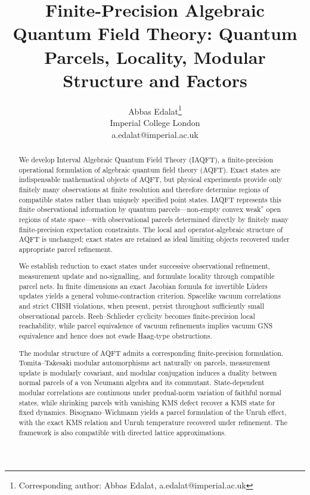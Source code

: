 \documentclass[11pt]{article}
\title{Finite-Precision Algebraic Quantum Field Theory: 
Quantum Parcels, Locality, Modular Structure and  Factors }
\author{Abbas Edalat\thanks{Corresponding author: Abbas Edalat, a.edalat@imperial.ac.uk}\\Imperial College London\\a.edalat@imperial.ac.uk}
\date{}
\begin{document}
\maketitle

\begin{abstract}
We develop Interval Algebraic Quantum Field Theory (IAQFT), a
finite-precision operational formulation of algebraic quantum field
theory (AQFT). Exact states are indispensable mathematical objects of
AQFT, but physical experiments provide only finitely many observations
at finite resolution and therefore determine regions of compatible
states rather than uniquely specified point states. IAQFT represents
this finite observational information by quantum parcels---non-empty
convex weak$^*$ open regions of state space---with observational parcels
determined directly by finitely many finite-precision expectation
constraints. The local and operator-algebraic structure of AQFT is
unchanged; exact states are retained as ideal limiting objects recovered
under appropriate parcel refinement.

We establish reduction to exact states under successive observational
refinement, measurement update and no-signalling, and formulate locality
through compatible parcel nets. In finite dimensions an exact Jacobian
formula for invertible L\"uders updates yields a general
volume-contraction criterion. Spacelike vacuum correlations and strict
CHSH violations, when present, persist throughout sufficiently small
observational parcels. Reeh--Schlieder cyclicity becomes finite-precision local
reachability, while parcel equivalence of vacuum refinements implies
vacuum GNS equivalence and hence does not evade Haag-type obstructions.

The modular structure of AQFT admits a corresponding finite-precision
formulation. Tomita--Takesaki modular automorphisms act naturally on
parcels, measurement update is modularly covariant, and modular
conjugation induces a duality between normal parcels of a von Neumann
algebra and its commutant. State-dependent modular correlations are
continuous under predual-norm variation of faithful normal states,
while shrinking parcels with vanishing KMS defect recover a KMS state
for fixed dynamics. Bisognano--Wichmann yields a parcel formulation of
the Unruh effect, with the exact KMS relation and Unruh temperature
recovered under refinement. The framework is also compatible with
directed lattice approximations.


\end{abstract}
\end{document}
